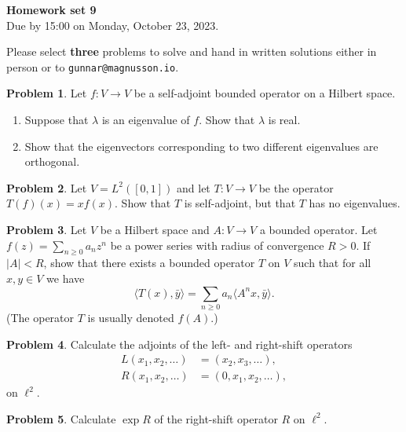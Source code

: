 \documentclass[11pt]{article}
\theoremstyle{definition}
\newtheorem{prob}{Problem}
\def\<{\langle}
\def\>{\rangle}
\def\head{
	\begin{center}
		\textbf{\LARGE Homework set 9}
		\\[3pt]
		Due by 15:00 on Monday, October 23, 2023.
	\end{center}
	\medskip
}
\begin{document}
\head

Please select \textbf{three} problems to solve and hand in written solutions
either in person or to \verb+gunnar@magnusson.io+.

\begin{prob}
	Let $f : V \to V$ be a self-adjoint bounded operator on a Hilbert space.
	\begin{enumerate}
		\item
			Suppose that $\lambda$ is an eigenvalue of $f$. Show that $\lambda$ is real.

		\item
			Show that the eigenvectors corresponding to two different eigenvalues are orthogonal.
	\end{enumerate}
\end{prob}

\begin{prob}
	Let $V = L^2([0,1])$ and let $T : V \to V$ be the operator $T(f)(x) = x f(x)$.
	Show that $T$ is self-adjoint, but that $T$ has no eigenvalues.
\end{prob}

\begin{prob}
	Let $V$ be a Hilbert space and $A : V \to V$ a bounded operator.
	Let $f(z) = \sum_{n \geq 0} a_n z^n$ be a power series with radius of convergence $R > 0$.
	If $|A| < R$, show that there exists a bounded operator $T$ on $V$ such that for all $x,y \in V$ we have
	\[
		\< T(x), \bar y \> = \sum_{n \geq 0} a_n \< A^n x, \bar y \>.
	\]
	(The operator $T$ is usually denoted $f(A)$.)
\end{prob}

\begin{prob}
	Calculate the adjoints of the left- and right-shift operators
	\begin{align*}
		L(x_1, x_2, \ldots) & = (x_2, x_3, \ldots),
		\\
		R(x_1, x_2, \ldots) & = (0, x_1, x_2, \ldots),
	\end{align*}
	on $\ell^2$.
\end{prob}

\begin{prob}
	Calculate $\exp R$ of the right-shift operator $R$ on $\ell^2$.
\end{prob}
\end{document}
